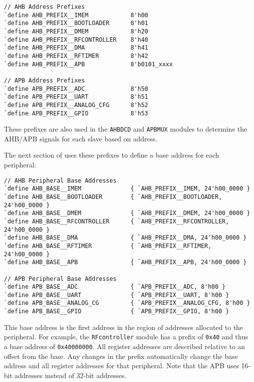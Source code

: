 \begin{lstlisting}
// AHB Address Prefixes
`define AHB_PREFIX__IMEM            8'h00
`define AHB_PREFIX__BOOTLOADER      8'h01
`define AHB_PREFIX__DMEM            8'h20
`define AHB_PREFIX__RFCONTROLLER    8'h40
`define AHB_PREFIX__DMA             8'h41
`define AHB_PREFIX__RFTIMER         8'h42
`define AHB_PREFIX__APB             8'b0101_xxxx

// APB Address Prefixes
`define APB_PREFIX__ADC             8'h50
`define APB_PREFIX__UART            8'h51
`define APB_PREFIX__ANALOG_CFG      8'h52
`define APB_PREFIX__GPIO            8'h53
\end{lstlisting}

These prefixes are also used in the \texttt{AHBDCD} and \texttt{APBMUX} modules to determine the AHB/APB signals for each slave based on address.

The next section of  uses these prefixes to define a base address for each peripheral:

\begin{lstlisting}
// AHB Peripheral Base Addresses
`define AHB_BASE__IMEM              { `AHB_PREFIX__IMEM, 24'h00_0000 }
`define AHB_BASE__BOOTLOADER        { `AHB_PREFIX__BOOTLOADER, 24'h00_0000 }
`define AHB_BASE__DMEM              { `AHB_PREFIX__DMEM, 24'h00_0000 }
`define AHB_BASE__RFCONTROLLER      { `AHB_PREFIX__RFCONTROLLER, 24'h00_0000 }
`define AHB_BASE__DMA               { `AHB_PREFIX__DMA, 24'h00_0000 }
`define AHB_BASE__RFTIMER           { `AHB_PREFIX__RFTIMER, 24'h00_0000 }
`define AHB_BASE__APB               { `AHB_PREFIX__APB, 24'h00_0000 }

// APB Peripheral Base Addresses
`define APB_BASE__ADC               { `APB_PREFIX__ADC, 8'h00 }
`define APB_BASE__UART              { `APB_PREFIX__UART, 8'h00 }
`define APB_BASE__ANALOG_CG         { `APB_PREFIX__ANALOG_CFG, 8'h00 }
`define APB_BASE__GPIO              { `APB_PREFIX__GPIO, 8'h00 }
\end{lstlisting}

This base address is the first address in the region of addresses allocated to the peripheral. For example, the \texttt{RFcontroller} module has a prefix of \texttt{0x40} and thus a base address of \texttt{0x40000000}. All register addresses are described relative to an offset from the base. Any changes in the prefix automatically change the base address and all register addresses for that peripheral. Note that the APB uses 16-bit addresses instead of 32-bit addresses.

